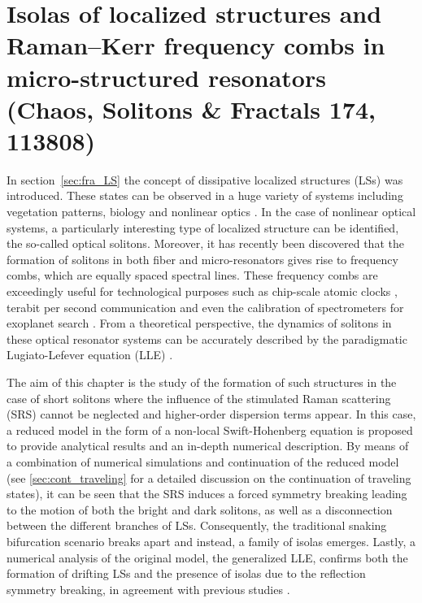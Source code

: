 \chapter{Isolas of localized structures and Raman–Kerr frequency combs in micro-structured resonators (Chaos, Solitons \& Fractals 174, 113808)}

In section~\ref{sec:fra_LS} the concept of dissipative 
localized structures (LSs) was introduced. These states can be observed in a huge variety
of systems including vegetation patterns, biology and 
nonlinear optics \cite{tlidi2014localized,heimburg2005soliton}. In the case of nonlinear optical systems,
a particularly interesting type of localized structure can be identified,
the so-called optical solitons. Moreover, it has recently been discovered that the formation of solitons
in both fiber and micro-resonators gives rise to frequency combs, which are equally
spaced spectral lines. These frequency combs are exceedingly useful
for technological purposes such as chip-scale atomic clocks \cite{Jost2015clock}, terabit
per second communication \cite{marin2017microresonator} and even the calibration of spectrometers
for exoplanet search \cite{suh2019searching}. From a theoretical perspective, the dynamics
of solitons in these optical resonator systems can be accurately described 
by the paradigmatic Lugiato-Lefever equation (LLE) \cite{lugiatolefever1987}.

The aim of this chapter is the study of the formation of such structures in the
case of short solitons where the influence of the stimulated Raman scattering (SRS)
cannot be neglected and higher-order dispersion terms appear. In this case, a reduced model
in the form of a non-local Swift-Hohenberg equation is proposed to provide 
analytical results and an in-depth numerical description. By means of a combination of
numerical simulations and
continuation of the reduced model (see \ref{sec:cont_traveling} for a detailed discussion on the
continuation of traveling states), it can be seen that the SRS induces a forced symmetry
breaking leading to the motion of both the bright and dark solitons, as well as a disconnection between 
the different branches of LSs. Consequently, the traditional snaking bifurcation scenario breaks
apart and instead, a family of isolas emerges. Lastly, a numerical analysis of the
original model, the generalized LLE, confirms both the formation of drifting LSs and
the presence of isolas due to the reflection symmetry breaking, in agreement with previous studies \cite{burke2009swift,parra2014third}.

